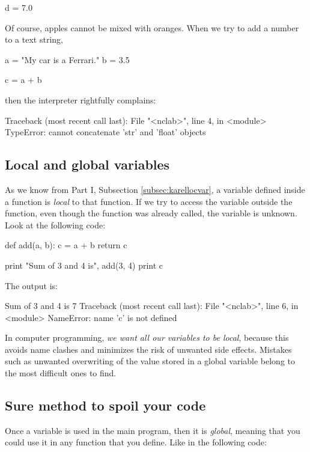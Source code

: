 \begin{bluecode}
d = 7.0
\end{bluecode}
Of course, apples cannot be mixed with oranges. When we try to 
add a number to a text string,

\begin{bluecode}
a = "My car is a Ferrari."
b = 3.5

c = a + b
\end{bluecode}
then the interpreter rightfully complains:

\begin{bluecode}
Traceback (most recent call last):
  File "<nclab>", line 4, in <module>
TypeError: cannot concatenate 'str' and 'float' objects
\end{bluecode}

\subsection{Local and global variables} \label{subsec:pythonlocvar}

As we know from Part I, Subsection \ref{subsec:karellocvar}, a variable defined 
inside a function is {\em local} to that function. If we try to access 
the variable outside the function, even though the function was 
already called, the variable is  unknown. Look at the following 
code:

\begin{bluecode}
def add(a, b):
    c = a + b
    return c

print "Sum of 3 and 4 is", add(3, 4)
print c
\end{bluecode}
The output is:

\begin{bluecode}
Sum of 3 and 4 is 7
Traceback (most recent call last):
  File "<nclab>", line 6, in <module>
NameError: name 'c' is not defined
\end{bluecode}
In computer programming, {\em we want all our variables to be local}, because 
this avoids name clashes and minimizes the risk of unwanted side effects.
Mistakes such as unwanted overwriting of the value stored in a global variable 
belong to the most difficult ones to find.

\subsection{Sure method to spoil your code}

Once a variable is used in the main program, 
then it is {\em global}, meaning that you could use it in 
any function that you define. Like in the following 
code:

